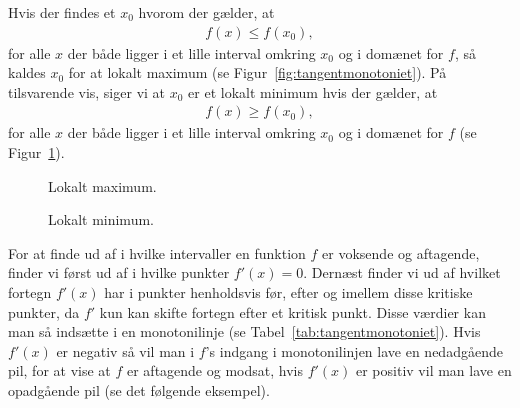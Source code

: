 Hvis der findes et $x_0$ hvorom der gælder, at 
\begin{align*}
f(x) \leq f(x_0),
\end{align*}
for alle $x$ der både ligger i et lille interval omkring $x_0$ og i domænet for $f$, så kaldes $x_0$ for at lokalt maximum (se Figur~\ref{fig:tangentmonotoniet}). På tilsvarende vis, siger vi at $x_0$ er et lokalt minimum hvis der gælder, at
\begin{align*}
f(x) \geq f(x_0),
\end{align*}
for alle $x$ der både ligger i et lille interval omkring $x_0$ og i domænet for $f$ (se Figur~\ref{fig:tangentmonotonito}).
\begin{figure}[!htbp]
\begin{minipage}{0.49\textwidth}
\centering
{}
\caption{Lokalt maximum.}
\label{fig:tangentmonotoniet}
\end{minipage}
\begin{minipage}{0.49\textwidth}
 \centering
{}
\caption{Lokalt minimum.}
\label{fig:tangentmonotonito}
\end{minipage}
\end{figure}

For at finde ud af i hvilke intervaller en funktion $f$ er voksende og aftagende, finder vi først ud af i hvilke punkter $f'(x)=0$. Dernæst finder vi ud af hvilket fortegn $f'(x)$ har i punkter henholdsvis før, efter og imellem disse kritiske punkter, da $f'$ kun kan skifte fortegn efter et kritisk punkt. Disse værdier kan man så indsætte i en monotonilinje (se Tabel~\ref{tab:tangentmonotoniet}). Hvis $f'(x)$ er negativ så vil man i $f$'s indgang i monotonilinjen lave en nedadgående pil, for at vise at $f$ er aftagende og modsat, hvis $f'(x)$ er positiv vil man lave en opadgående pil (se det følgende eksempel).

